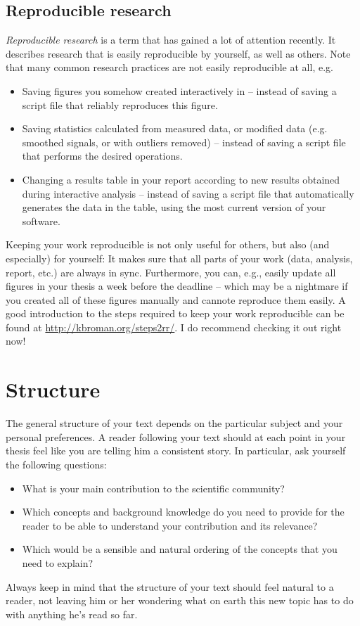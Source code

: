 \subsection{Reproducible research}
\emph{Reproducible research} is a term that has gained a lot of attention recently.
It describes research that is easily reproducible by yourself, as well as others.
Note that many common research practices are not easily reproducible at all, e.g.
\begin{itemize}
\item Saving figures you somehow created interactively in  -- instead of saving a script file that reliably reproduces this figure.
\item Saving statistics calculated from measured data, or modified data (e.g. smoothed signals, or with outliers removed) -- instead of saving a script file that performs the desired operations.
\item Changing a results table in your report according to new results obtained during interactive analysis -- instead of saving a script file that automatically generates the data in the table, using the most current version of your software.
\end{itemize}
Keeping your work reproducible is not only useful for others, but also (and especially) for yourself: It makes sure that all parts of your work (data, analysis, report, etc.) are always in sync.
Furthermore, you can, e.g., easily update all figures in your thesis a week before the deadline -- which may be a nightmare if you created all of these figures manually and cannote reproduce them easily.
A good introduction to the steps required to keep your work reproducible can be found at \url{http://kbroman.org/steps2rr/}.
I do recommend checking it out right now!

\section{Structure}
The general structure of your text depends on the particular subject and your personal preferences.
A reader following your text should at each point in your thesis feel like you are telling him a consistent story.
In particular, ask yourself the following questions:
\begin{itemize}
\item What is your main contribution to the scientific community? 
\item Which concepts and background knowledge do you need to provide for the reader to be able to understand your contribution and its relevance?
\item Which would be a sensible and natural ordering of the concepts that you need to explain?
\end{itemize}
Always keep in mind that the structure of your text should feel natural to a reader, not leaving him or her wondering what on earth this new topic has to do with anything he's read so far.

